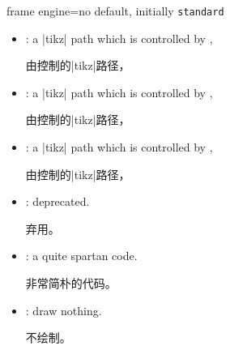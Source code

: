 \begin{docTcbKey}{frame engine}{=}{no default, initially \texttt{standard}}
\begin{itemize}
由控制的|tikz|路径，

  \item{}: 
a |tikz| path which is controlled by ,

由控制的|tikz|路径，

  \item{}: 
a |tikz| path which is controlled by ,

由控制的|tikz|路径，
  \item{}: 
a |tikz| path which is controlled by ,

由控制的|tikz|路径，
  \item{}: 
deprecated.

弃用。
  \item{}: 
a quite spartan code.

非常简朴的代码。
  \item{}: 
draw nothing.

不绘制。
\end{itemize}
\end{docTcbKey}

